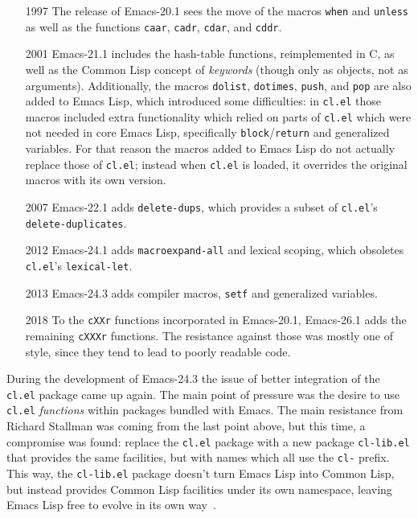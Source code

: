 \documentclass[format=acmsmall, review]{acmart}
\newcommand \Elisp {Emacs Lisp}
\begin{document}
\begin{itemize}
\item[1997] The release of Emacs-20.1 sees the move of the
  macros \texttt{when} and \texttt{unless} as well as the functions
  \texttt{caar}, \texttt{cadr}, \texttt{cdar}, and \texttt{cddr}.
\item[2001] Emacs-21.1 includes the hash-table functions, reimplemented in
  C, as well as the Common Lisp concept of \emph{keywords} (though only as
  objects, not as arguments). %
  Additionally, the macros \texttt{dolist},
  \texttt{dotimes}, \texttt{push}, and \texttt{pop} are also added to
  \Elisp{}, which introduced some difficulties: in \texttt{cl.el} those
  macros included extra functionality which relied on parts of
  \texttt{cl.el} which were not needed in core \Elisp,
  specifically \texttt{block}/\texttt{return} and generalized variables.
  For that reason the macros added to \Elisp{} do not actually replace those
  of \texttt{cl.el}; instead when \texttt{cl.el} is loaded, it overrides the
  original macros with its own version.
\item[2007] Emacs-22.1 adds \texttt{delete-dups}, which provides a subset of
  \texttt{cl.el}'s \texttt{delete-duplicates}.
\item[2012] Emacs-24.1 adds \texttt{macroexpand-all} and lexical scoping,
  which obsoletes \texttt{cl.el}'s \texttt{lexical-let}.
\item[2013] Emacs-24.3 adds compiler macros, \texttt{setf} and
  generalized variables.
\item[2018] To the \texttt{cXXr} functions incorporated in Emacs-20.1,
  Emacs-26.1 adds the remaining \texttt{cXXXr} functions.  The resistance
  against those was mostly one of style, since they tend to lead to poorly
  readable code.
\end{itemize}
During the development of Emacs-24.3 the issue of better integration of the
\texttt{cl.el} package came up again.  The main point of pressure was the
desire to use \texttt{cl.el} \emph{functions} within packages bundled with
Emacs.  The main resistance from Richard Stallman was coming from the last point
above, but this time, a compromise was found: replace
the \texttt{cl.el} package with a new package \texttt{cl-lib.el}
that provides the same facilities, but with names which all use the
\texttt{cl-} prefix.  This way, the \texttt{cl-lib.el} package doesn't turn
\Elisp{} into Common Lisp, but instead provides Common Lisp
facilities under its own namespace, leaving \Elisp{} free to evolve in its
own way~\cite{RMS-cl-real}.
\end{document}
